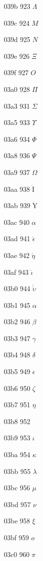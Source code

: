 \documentclass[11pt]{article}
\begin{document}

039b 923 \ensuremath{\Lambda}

039c 924 \ensuremath{M}

039d 925 \ensuremath{N}

039e 926 \ensuremath{\Xi}

039f 927 \ensuremath{O}

03a0 928 \ensuremath{\Pi}


03a3 931 \ensuremath{\Sigma}


03a5 933 \ensuremath{\Upsilon}

03a6 934 \ensuremath{\Phi}


03a8 936 \ensuremath{\Psi}

03a9 937 \ensuremath{\Omega}

03aa 938 \ensuremath{\mathrm{\ddot{I}}}

03ab 939 \ensuremath{\mathrm{\ddot{Y}}}

03ac 940 \'{$\alpha$}

03ad 941 \ensuremath{\acute{\epsilon}}

03ae 942 \ensuremath{\acute{\eta}}

03af 943 \ensuremath{\acute{\iota}}

03b0 944 \ensuremath{\acute{\ddot{\upsilon}}}

03b1 945 \ensuremath{\alpha}

03b2 946 \ensuremath{\beta}

03b3 947 \ensuremath{\gamma}

03b4 948 \ensuremath{\delta}

03b5 949 \ensuremath{\epsilon}

03b6 950 \ensuremath{\zeta}

03b7 951 \ensuremath{\eta}

03b8 952 \texttheta

03b9 953 \ensuremath{\iota}

03ba 954 \ensuremath{\kappa}

03bb 955 \ensuremath{\lambda}

03bc 956 \ensuremath{\mu}

03bd 957 \ensuremath{\nu}

03be 958 \ensuremath{\xi}

03bf 959 \ensuremath{o}

03c0 960 \ensuremath{\pi}
\end{document}
